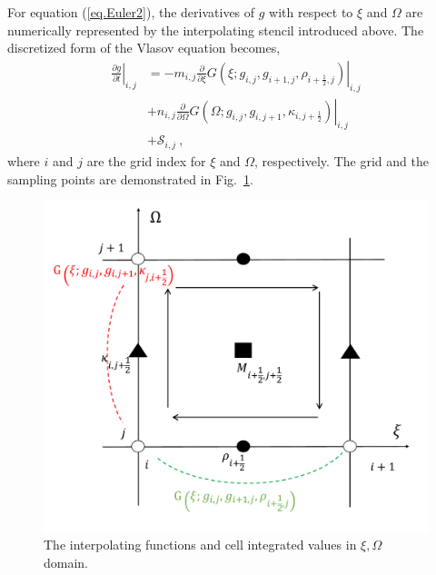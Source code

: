 For equation (\ref{eq.Euler2}), the derivatives of $g$ with respect to $\xi$ and $\Omega$ are numerically represented by the interpolating stencil introduced above. 
The discretized form of the Vlasov equation becomes,
\begin{equation}\label{eq.disV}
    \begin{aligned}
    \left.\frac{\partial g}{\partial t}\right|_{i,j}   & =  - m_{i,j} \left.\frac{\partial}{\partial \xi} G\left(\xi;g_{i,j},g_{i+1,j},\rho_{i+\frac{1}{2},j}\right)\right|_{i,j} 
    \\
    & + n_{i,j}  \left.\frac{\partial}{\partial \Omega}G\left(\Omega;g_{i,j},g_{i,j+1},\kappa_{i,j+\frac{1}{2}}\right)\right|_{i,j}
    \\
    & +  \mathcal{S}_{i,j}~,
    \end{aligned}
\end{equation}
where $i$ and $j$ are the grid index for $\xi$ and $\Omega$, respectively. 
The grid and the sampling points are demonstrated in Fig.~\ref{fig.grids}.
\begin{figure}[htbp]
    \centering
    \includegraphics[scale=0.3]{cpc_img/IDO.pdf}
    \caption{The interpolating functions and cell integrated values in $\xi,\Omega$ domain.}
    \label{fig.grids}
\end{figure}

